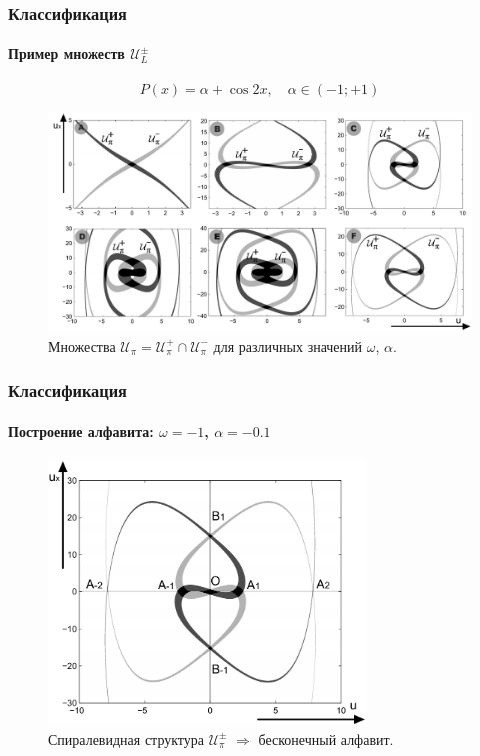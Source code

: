 \documentclass{beamer}
\begin{document}
\begin{frame}
	\frametitle{Классификация}
	\framesubtitle{Пример множеств $\mathcal{U}_L^{\pm}$}
	$$P(x) = \alpha + \cos{2x}, \quad \alpha \in (-1; +1)$$
	\begin{figure}
		\includegraphics[width=1\textwidth]{pic/sets.pdf}
		\caption{Множества $\mathcal{U}_{\pi} = \mathcal{U}_{\pi}^+ \cap \mathcal{U}_{\pi}^-$ для различных значений $\omega$, $\alpha$.}
		\label{pic:sets}
	\end{figure}
\end{frame}

\begin{frame}
	\frametitle{Классификация}
	\framesubtitle{Построение алфавита: $\omega = -1$, $\alpha = -0.1$}
	\begin{figure}
		\includegraphics[width=0.75\textwidth]{pic/alphabet.pdf}
		\caption{Спиралевидная структура $\mathcal{U}_{\pi}^{\pm}$ $\Rightarrow$ бесконечный алфавит.}
		\label{pic:alphabet}
	\end{figure}
\end{frame}
\end{document}
